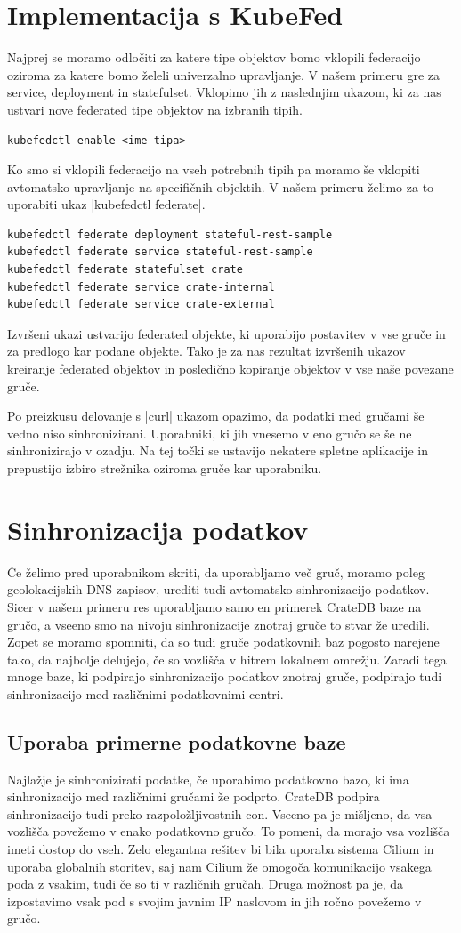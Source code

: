 \documentclass[a4paper, 12pt]{book}
\begin{document}
\section{Implementacija s KubeFed}
Najprej se moramo odločiti za katere tipe objektov bomo vklopili federacijo oziroma za katere bomo želeli univerzalno upravljanje.
V našem primeru gre za service, deployment in statefulset. Vklopimo jih z naslednjim ukazom, ki za nas ustvari nove federated tipe objektov na izbranih tipih.
\begin{verbatim}
kubefedctl enable <ime tipa>
\end{verbatim}
Ko smo si vklopili federacijo na vseh potrebnih tipih pa moramo še vklopiti avtomatsko upravljanje na specifičnih objektih.
V našem primeru želimo za to uporabiti ukaz \spverb|kubefedctl federate|.
\begin{verbatim}
kubefedctl federate deployment stateful-rest-sample
kubefedctl federate service stateful-rest-sample
kubefedctl federate statefulset crate
kubefedctl federate service crate-internal
kubefedctl federate service crate-external
\end{verbatim}
Izvršeni ukazi ustvarijo federated objekte, ki uporabijo postavitev v vse gruče in za predlogo kar podane objekte.
Tako je za nas rezultat izvršenih ukazov kreiranje federated objektov in posledično kopiranje objektov v vse naše povezane gruče.

Po preizkusu delovanje s \spverb|curl| ukazom opazimo, da podatki med gručami še vedno niso sinhronizirani.
Uporabniki, ki jih vnesemo v eno gručo se še ne sinhronizirajo v ozadju.
Na tej točki se ustavijo nekatere spletne aplikacije in prepustijo izbiro strežnika oziroma gruče kar uporabniku.
\section{Sinhronizacija podatkov}
Če želimo pred uporabnikom skriti, da uporabljamo več gruč, moramo poleg geolokacijskih DNS zapisov, urediti tudi avtomatsko sinhronizacijo podatkov.
Sicer v našem primeru res uporabljamo samo en primerek CrateDB baze na gručo, a vseeno smo na nivoju sinhronizacije znotraj gruče to stvar že uredili. 
Zopet se moramo spomniti, da so tudi gruče podatkovnih baz pogosto narejene tako, da najbolje delujejo, če so vozlišča v hitrem lokalnem omrežju.
Zaradi tega mnoge baze, ki podpirajo sinhronizacijo podatkov znotraj gruče, podpirajo tudi sinhronizacijo med različnimi podatkovnimi centri.
\subsection{Uporaba primerne podatkovne baze}
Najlažje je sinhronizirati podatke, če uporabimo podatkovno bazo, ki ima sinhronizacijo med različnimi gručami že podprto.
CrateDB podpira sinhronizacijo tudi preko razpoložljivostnih con.
Vseeno pa je mišljeno, da vsa vozlišča povežemo v enako podatkovno gručo.
To pomeni, da morajo vsa vozlišča imeti dostop do vseh.
Zelo elegantna rešitev bi bila uporaba sistema Cilium in uporaba globalnih storitev, saj nam Cilium že omogoča komunikacijo vsakega poda z vsakim, tudi če so ti v različnih gručah.
Druga možnost pa je, da izpostavimo vsak pod s svojim javnim IP naslovom in jih ročno povežemo v gručo.
\end{document}

